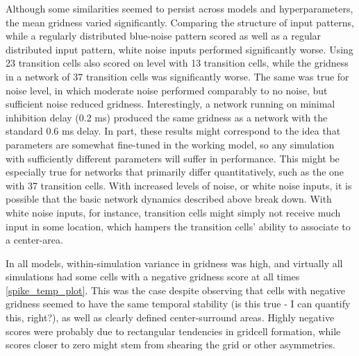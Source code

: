 \documentclass{article}
\begin{document}
    Although some similarities seemed to persist across models and hyperparameters, the mean gridness varied significantly. Comparing the structure of input patterns, while a regularly distributed blue-noise pattern scored as well as a regular distributed input pattern, white noise inputs performed significantly worse.  Using 23 transition cells also scored on level with 13 transition cells, while the gridness in a network of 37 transition cells was significantly worse. The same was true for noise level, in which moderate noise performed comparably to no noise, but sufficient noise reduced gridness. Interestingly, a network running on minimal inhibition delay (0.2 ms) produced the same gridness as a network with the standard 0.6 ms delay.
    In part, these results might correspond to the idea that parameters are somewhat fine-tuned in the working model, so any simulation with sufficiently different parameters will suffer in performance. This might be especially true for networks that primarily differ quantitatively, such as the one with 37 transition cells. With increased levels of noise, or white noise inputs, it is possible that the basic network dynamics described above break down. With white noise inputs, for instance, transition cells might simply not receive much input in some location, which hampers the transition cells' ability to associate to a center-area. 

    In all models, within-simulation variance in gridness was high, and virtually all simulations had some cells with a negative gridness score at all times \ref{spike_temp_plot}. This was the case despite observing that cells with negative gridness seemed to have the same temporal stability (is this true - I can quantify this, right?), as well as clearly defined center-surround areas. Highly negative scores were probably due to rectangular tendencies in gridcell formation, while scores closer to zero might stem from shearing the grid or other asymmetries. 
\end{document}
